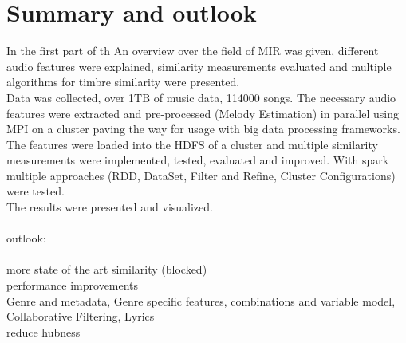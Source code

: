 \section{Summary and outlook}

In the first part of th
An overview over the field of MIR was given, different audio features were explained, similarity measurements evaluated and multiple algorithms for timbre similarity were presented.\\
Data was collected, over 1TB of music data, 114000 songs. The necessary audio features were extracted and pre-processed (Melody Estimation) in parallel using MPI on a cluster paving the way for usage with big data processing frameworks.\\
The features were loaded into the HDFS of a cluster and multiple similarity measurements were implemented, tested, evaluated and improved. With spark multiple approaches (RDD, DataSet, Filter and Refine, Cluster Configurations) were tested.\\
The results were presented and visualized.\\
\ \\
outlook:\\
\ \\
more state of the art similarity (blocked)\\
performance improvements\\
Genre and metadata, Genre specific features, combinations and variable model, Collaborative Filtering, Lyrics\\
reduce hubness\\


